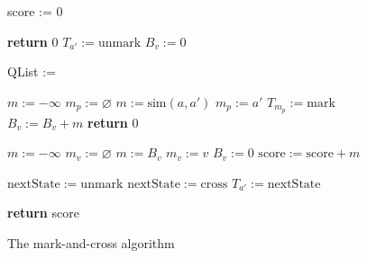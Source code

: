 \begin{figure}
\begin{algorithmic}[1]

\State score := 0

\State \textbf{return} 0 
\EndIf
{}
\State $T_{a'} := \mathrm{unmark}$ 
\EndFor
{}
\State $B_v := 0$ 
\EndFor

\State QList := 


\State $m := -\infty$
\State $m_p := \varnothing$
\State $m := \mathrm{sim}(a, a')$ 
\State $m_p := a'$ 
\EndIf
\EndFor
{}
\State $T_{m_p} := \mathrm{mark}$ 
\State $B_v := B_v + m$
\Else
{}
\State \textbf{return} 0 
\EndIf
\EndFor

\label{line_bond_finish}

\State $m := -\infty$
\State $m_v := \varnothing $
\State $m := B_v$ 
\State $m_v := v$ 
\EndIf
\State $B_v := 0$ 
\EndFor
\State $\mathrm{score} := \mathrm{score} + m$ 

\State $\mathrm{nextState} := \mathrm{unmark}$ 
\Else
\State $\mathrm{nextState} := \mathrm{cross}$ 
\EndIf
{}
\State $T_{a'} := \mathrm{nextState}$ 
\EndIf
\EndFor
\EndFor

\EndIf

\EndFor

\State \textbf{return} score
\EndProcedure

\end{algorithmic}
\caption{The mark-and-cross algorithm}\label{markcrossalgo}
\end{figure}

